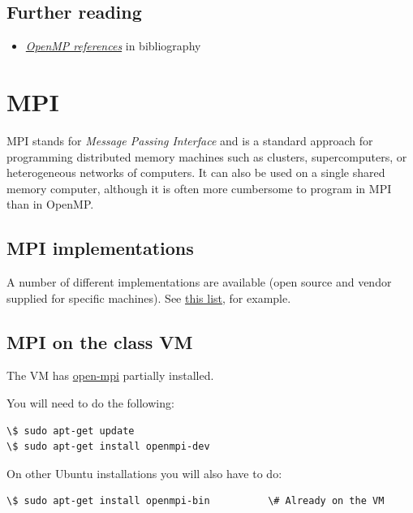 \documentclass[letterpaper,10pt,english]{sphinxmanual}
\begin{document}
\subsection{Further reading}
\label{openmp:further-reading}\begin{itemize}
\item {} 
{\hyperref[biblio:biblio-openmp]{\emph{OpenMP references}}} in bibliography

\end{itemize}


\section{MPI}
\label{mpi:id1}\label{mpi::doc}\label{mpi:mpi}
MPI stands for \emph{Message Passing Interface} and is a standard approach for
programming distributed memory machines such as clusters, supercomputers, or
heterogeneous networks of computers.  It can also be used on a single
shared memory computer, although it is often more cumbersome to program in
MPI than in OpenMP.


\subsection{MPI implementations}
\label{mpi:mpi-implementations}
A number of different implementations are available (open source and vendor
supplied for specific machines).   See
\href{http://www.mcs.anl.gov/research/projects/mpi/implementations.html}{this list}, for
example.


\subsection{MPI on the class VM}
\label{mpi:mpi-on-the-class-vm}
The VM has \href{http://www.open-mpi.org/}{open-mpi}  partially installed.

You will need to do the following:

\begin{Verbatim}[commandchars=\\\{\}]
\$ sudo apt-get update
\$ sudo apt-get install openmpi-dev
\end{Verbatim}

On other Ubuntu installations you will also have to do:

\begin{Verbatim}[commandchars=\\\{\}]
\$ sudo apt-get install openmpi-bin          \# Already on the VM
\end{Verbatim}
\end{document}
